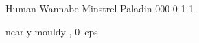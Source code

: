 \filledCS%
  {\composeHumanName}%
  {Human}%
  {Wannabe Minstrel}%
  {Paladin}%
  {{0}{0}{0}}%
  {{0}{-1}{-1}}%
  {%
    \renewcommand\rank{Fodder}
    \renewcommand\characterDebt{100 \glspl{sp}}
    \setcounter{Academics}{1}
    \setcounter{Cultivation}{1}
    \setcounter{Performance}{1}
    \setcounter{Stealth}{1}
    \setcounter{Medicine}{1}

    \setcounter{Brawl}{1}
    \setcounter{Projectiles}{1}
    \Dagger
  }%
  {\unstoppable}%
  {nearly-mouldy \rations, 0~\glspl{cp}}%


